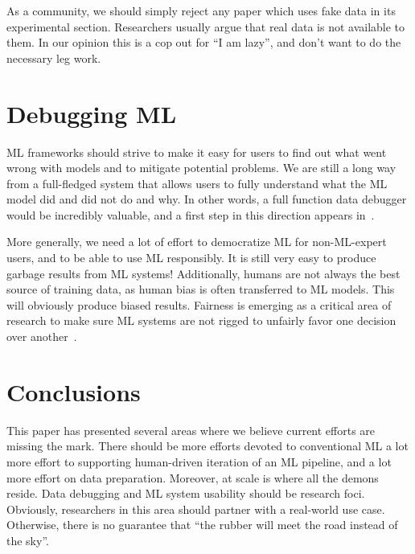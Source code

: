 \documentclass[11pt]{article}
\begin{document}
As a community, we should simply reject any paper which uses fake data in its experimental section.  Researchers usually argue that real data is not available to them.  In our opinion this is a cop out for “I am lazy”, and don’t want to do the necessary leg work.

\section{Debugging ML}

ML frameworks should strive to make it easy for users to find out what went wrong with models and to mitigate potential problems. We are still a long way from a full-fledged system that allows users to fully understand what the ML model did and did not do and why.  In other words, a full function data debugger would be incredibly valuable, and a first step in this direction appears in~\cite{11}. 

More generally, we need a lot of effort to democratize ML for non-ML-expert users, and to be able to use ML responsibly. It is still very easy to produce garbage results from ML systems!  Additionally, humans are not always the best source of training data, as human bias is often transferred to ML models.  This will obviously produce biased results.  Fairness is emerging as a critical area of research to make sure ML systems are not rigged to unfairly favor one decision over another~\cite{3}.

\section{Conclusions}

This paper has presented several areas where we believe current efforts are missing the mark.  There should be more efforts devoted to conventional ML  a lot more effort to supporting human-driven iteration of an ML pipeline, and a lot more effort on data preparation.   Moreover, at scale is where all the demons reside.  Data debugging and ML system usability should be research foci.  Obviously, researchers in this area should partner with a real-world use case.  Otherwise, there is no guarantee that “the rubber will meet the road instead of the sky”.
\end{document}
